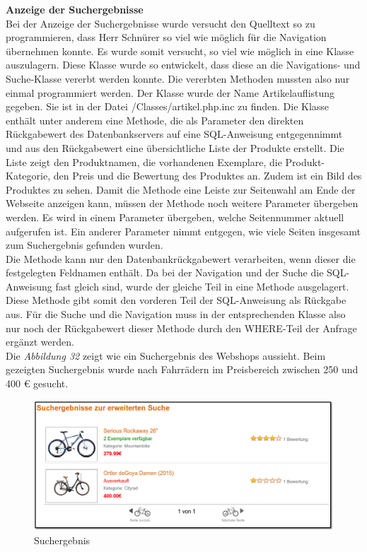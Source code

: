 \textbf{Anzeige der Suchergebnisse}\\
Bei der Anzeige der Suchergebnisse wurde versucht den Quelltext so zu programmieren, dass Herr Schnürer so viel wie möglich für die Navigation übernehmen konnte. Es wurde somit versucht, so viel wie möglich in eine Klasse auszulagern. Diese Klasse wurde so entwickelt, dass diese an die Navigations- und Suche-Klasse vererbt werden konnte. Die vererbten Methoden mussten also nur einmal programmiert werden. Der Klasse wurde der Name \glqq Artikelauflistung\grqq{} gegeben. Sie ist in der Datei \glqq /Classes/artikel.php.inc\grqq{} zu finden. Die Klasse enthält unter anderem eine Methode, die als Parameter den direkten Rückgabewert des Datenbankservers auf eine SQL-Anweisung entgegennimmt und aus den Rückgabewert eine übersichtliche Liste der Produkte erstellt. Die Liste zeigt den Produktnamen, die vorhandenen Exemplare, die Produkt-Kategorie, den Preis und die Bewertung des Produktes an. Zudem ist ein Bild des Produktes zu sehen. Damit die Methode eine Leiste zur Seitenwahl am Ende der Webseite anzeigen kann, müssen der Methode noch weitere Parameter übergeben werden. Es wird in einem Parameter übergeben, welche Seitennummer aktuell aufgerufen ist. Ein anderer Parameter nimmt entgegen, wie viele Seiten insgesamt zum Suchergebnis gefunden wurden. \\
Die Methode kann nur den Datenbankrückgabewert verarbeiten, wenn dieser die festgelegten Feldnamen enthält. Da bei der Navigation und der Suche die SQL-Anweisung fast gleich sind, wurde der gleiche Teil in eine Methode ausgelagert. Diese Methode gibt somit den vorderen Teil der SQL-Anweisung als Rückgabe aus. Für die Suche und die Navigation muss in der entsprechenden Klasse also nur noch der Rückgabewert dieser Methode durch den \glqq WHERE-Teil \grqq{} der Anfrage ergänzt werden.\\
Die \textit{Abbildung 32} zeigt wie ein Suchergebnis des Webshops aussieht. Beim gezeigten Suchergebnis wurde nach Fahrrädern im Preisbereich zwischen 250 und 400 € gesucht.

\begin{figure}[H]
	\begin{center}
			\includegraphics[width=130mm]{Bilder/suchergebnis.png}
	\end{center}
	\caption{Suchergebnis}
\end{figure}

